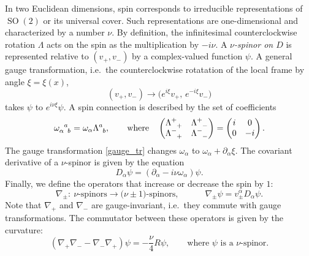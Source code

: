 \documentclass[12pt]{article}
\DeclareMathOperator{\SO}{SO}
\def\ie{i.e.\ }
\begin{document}
In two Euclidean dimensions, spin corresponds to irreducible representations of $\SO(2)$ or its universal cover. Such representations are one-dimensional and characterized by a number $\nu$. By definition, the infinitesimal counterclockwise rotation $\Lambda$ acts on the spin as the multiplication by $-i\nu$. A \emph{$\nu$-spinor on $D$} is represented relative to $(v_+,v_-)$ by a complex-valued function $\psi$. A general gauge transformation, \ie the counterclockwise rotatation of the local frame by angle $\xi=\xi(x)$,
\begin{equation}\label{gauge_tr}
(v_{+},v_{-}) \to \bigl(e^{i\xi}v_{+},\,e^{-i\xi}v_{-}\bigr)
\end{equation}
takes $\psi$ to $e^{i\nu\xi}\psi$. A spin connection is described by the set of coefficients
\begin{equation}
\tensor{\omega}{_\alpha^a_b}=\omega_{\alpha}\tensor{\Lambda}{^a_b},\qquad
\text{where}\quad
\begin{pmatrix}
\tensor{\Lambda}{^+_+} & \tensor{\Lambda}{^+_-}\\
\tensor{\Lambda}{^-_+} & \tensor{\Lambda}{^-_-}
\end{pmatrix}
=\begin{pmatrix} i & 0\\ 0 & -i
\end{pmatrix}.
\end{equation}
The gauge transformation \eqref{gauge_tr} changes $\omega_{\alpha}$ to
$\omega_{\alpha}+\partial_{\alpha}\xi$. The covariant derivative of a $\nu$-spinor is given by the equation
\begin{equation}
D_{\alpha}\psi=(\partial_\alpha-i\nu\omega_\alpha)\psi.
\end{equation}
Finally, we define the operators that increase or decrease the spin by $1$:
\begin{equation}
\nabla_{\pm}:\: \text{$\nu$-spinors}\to \text{($\nu\pm1$)-spinors},\qquad\quad
\nabla_{\pm}\psi=v_{\pm}^{\alpha}D_{\alpha}\psi.
\end{equation}
Note that $\nabla_{+}$ and $\nabla_{-}$ are gauge-invariant, \ie they commute with gauge transformations. The commutator between these operators is given by the curvature:
\begin{equation}
(\nabla_{+}\nabla_{-}-\nabla_{-}\nabla_{+})\psi=-\frac{\nu}{4}R\psi,\qquad
\text{where $\psi$ is a $\nu$-spinor}.
\end{equation}
\end{document}
